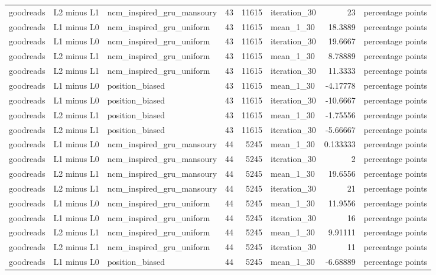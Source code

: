 \begin{table}[htbp!]
\begin{tabular}{lllrrlrl}
goodreads & L2 minus L1 & ncm\_inspired\_gru\_mansoury & 43 & 11615 & iteration\_30 & 23 & percentage points \\
goodreads & L1 minus L0 & ncm\_inspired\_gru\_uniform & 43 & 11615 & mean\_1\_30 & 18.3889 & percentage points \\
goodreads & L1 minus L0 & ncm\_inspired\_gru\_uniform & 43 & 11615 & iteration\_30 & 19.6667 & percentage points \\
goodreads & L2 minus L1 & ncm\_inspired\_gru\_uniform & 43 & 11615 & mean\_1\_30 & 8.78889 & percentage points \\
goodreads & L2 minus L1 & ncm\_inspired\_gru\_uniform & 43 & 11615 & iteration\_30 & 11.3333 & percentage points \\
goodreads & L1 minus L0 & position\_biased & 43 & 11615 & mean\_1\_30 & -4.17778 & percentage points \\
goodreads & L1 minus L0 & position\_biased & 43 & 11615 & iteration\_30 & -10.6667 & percentage points \\
goodreads & L2 minus L1 & position\_biased & 43 & 11615 & mean\_1\_30 & -1.75556 & percentage points \\
goodreads & L2 minus L1 & position\_biased & 43 & 11615 & iteration\_30 & -5.66667 & percentage points \\
goodreads & L1 minus L0 & ncm\_inspired\_gru\_mansoury & 44 & 5245 & mean\_1\_30 & 0.133333 & percentage points \\
goodreads & L1 minus L0 & ncm\_inspired\_gru\_mansoury & 44 & 5245 & iteration\_30 & 2 & percentage points \\
goodreads & L2 minus L1 & ncm\_inspired\_gru\_mansoury & 44 & 5245 & mean\_1\_30 & 19.6556 & percentage points \\
goodreads & L2 minus L1 & ncm\_inspired\_gru\_mansoury & 44 & 5245 & iteration\_30 & 21 & percentage points \\
goodreads & L1 minus L0 & ncm\_inspired\_gru\_uniform & 44 & 5245 & mean\_1\_30 & 11.9556 & percentage points \\
goodreads & L1 minus L0 & ncm\_inspired\_gru\_uniform & 44 & 5245 & iteration\_30 & 16 & percentage points \\
goodreads & L2 minus L1 & ncm\_inspired\_gru\_uniform & 44 & 5245 & mean\_1\_30 & 9.91111 & percentage points \\
goodreads & L2 minus L1 & ncm\_inspired\_gru\_uniform & 44 & 5245 & iteration\_30 & 11 & percentage points \\
goodreads & L1 minus L0 & position\_biased & 44 & 5245 & mean\_1\_30 & -6.68889 & percentage points \\

\end{tabular}
\end{table}
